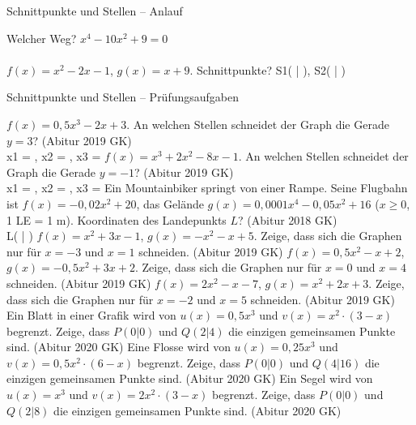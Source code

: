 \setcounter{aufgabe}{27}

\begin{aufgabe}{Schnittpunkte und Stellen – Anlauf}
\begin{teile}
\teil Welcher Weg? $x^4 - 10x^2 + 9 = 0$  \\  \\ 
\teil $f(x) = x^2 - 2x - 1$, $g(x) = x + 9$. Schnittpunkte? S1( \leerfeld | \leerfeld ), S2( \leerfeld | \leerfeld )
\end{teile}
\end{aufgabe}

\begin{aufgabe}{Schnittpunkte und Stellen – Prüfungsaufgaben}
\begin{teile}
\teil $f(x) = 0{,}5x^3 - 2x + 3$. An welchen Stellen schneidet der Graph die Gerade $y = 3$? \hfill (Abitur 2019 GK) \\ x1 = \leerfeld , x2 = \leerfeld , x3 = \leerfeld
\teil $f(x) = x^3 + 2x^2 - 8x - 1$. An welchen Stellen schneidet der Graph die Gerade $y = -1$? \hfill (Abitur 2019 GK) \\ x1 = \leerfeld , x2 = \leerfeld , x3 = \leerfeld
\teil Ein Mountainbiker springt von einer Rampe. Seine Flugbahn ist $f(x) = -0{,}02x^2 + 20$, das Gelände $g(x) = 0{,}0001x^4 - 0{,}05x^2 + 16$ ($x \ge 0$, 1 LE = 1 m). Koordinaten des Landepunkts $L$? \hfill (Abitur 2018 GK) \\ L( \leerfeld | \leerfeld )
\teil $f(x) = x^2 + 3x - 1$, $g(x) = -x^2 - x + 5$. Zeige, dass sich die Graphen nur für $x = -3$ und $x = 1$ schneiden. \hfill (Abitur 2019 GK)
\teil $f(x) = 0{,}5x^2 - x + 2$, $g(x) = -0{,}5x^2 + 3x + 2$. Zeige, dass sich die Graphen nur für $x = 0$ und $x = 4$ schneiden. \hfill (Abitur 2019 GK)
\teil $f(x) = 2x^2 - x - 7$, $g(x) = x^2 + 2x + 3$. Zeige, dass sich die Graphen nur für $x = -2$ und $x = 5$ schneiden. \hfill (Abitur 2019 GK)
\teil Ein Blatt in einer Grafik wird von $u(x) = 0{,}5x^3$ und $v(x) = x^2 \cdot (3 - x)$ begrenzt. Zeige, dass $P(0 | 0)$ und $Q(2 | 4)$ die einzigen gemeinsamen Punkte sind. \hfill (Abitur 2020 GK)
\teil Eine Flosse wird von $u(x) = 0{,}25x^3$ und $v(x) = 0{,}5x^2 \cdot (6 - x)$ begrenzt. Zeige, dass $P(0 | 0)$ und $Q(4 | 16)$ die einzigen gemeinsamen Punkte sind. \hfill (Abitur 2020 GK)
\teil Ein Segel wird von $u(x) = x^3$ und $v(x) = 2x^2 \cdot (3 - x)$ begrenzt. Zeige, dass $P(0 | 0)$ und $Q(2 | 8)$ die einzigen gemeinsamen Punkte sind. \hfill (Abitur 2020 GK)

\end{teile}
\end{aufgabe}
